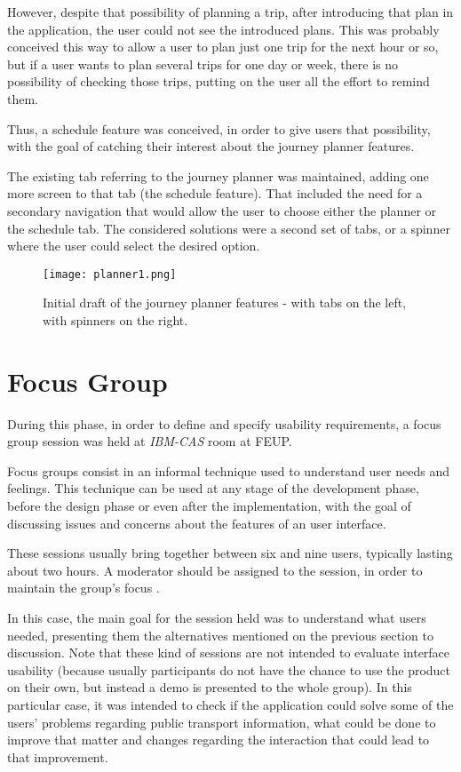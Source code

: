 However, despite that possibility of planning a trip, after introducing that plan in the application, the user could not see the introduced plans. This was probably conceived this way to allow a user to plan just one trip for the next hour or so, but if a user wants to plan several trips for one day or week, there is no possibility of checking those trips, putting on the user all the effort to remind them.

Thus, a schedule feature was conceived, in order to give users that possibility, with the goal of catching their interest about the journey planner features.

The existing tab referring to the journey planner was maintained, adding one more screen to that tab (the schedule feature). That included the need for a secondary navigation that would allow the user to choose either the planner or the schedule tab. The considered solutions were a second set of tabs, or a spinner where the user could select the desired option.

\begin{figure}[h!]
  \begin{center}
    \leavevmode
    \texttt{[image: planner1.png]}
    \caption{Initial draft of the journey planner features - with tabs on the left, with spinners on the right.}
    \label{fig:planner1}
  \end{center}
\end{figure}

\section{Focus Group}\label{focusgroup}

During this phase, in order to define and specify usability requirements, a focus group session was held at \emph{IBM-CAS} room at FEUP.

Focus groups consist in an informal technique used to understand user needs and feelings. This technique can be used at any stage of the development phase, before the design phase or even after the implementation, with the goal of discussing issues and concerns about  the features of an user interface. 

These sessions usually bring together between six and nine users, typically lasting about two hours. A moderator should be assigned to the session, in order to maintain the group's focus \cite{kn: Nielsen07}. 

In this case, the main goal for the session held was to understand what users needed, presenting them the alternatives mentioned on the previous section to discussion. Note that these kind of sessions are not intended to evaluate interface usability (because usually participants do not have the chance to use the product on their own, but instead a demo is presented to the whole group). In this particular case, it was intended to check if the application could solve some of the users' problems regarding public transport information, what could be done to improve that matter and changes regarding the interaction that could lead to that improvement.

